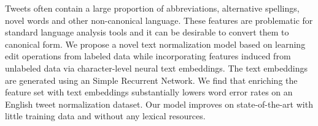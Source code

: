 Tweets often contain a large proportion of abbreviations, alternative spellings, novel words and other non-canonical language. These features are problematic for standard language analysis tools and it can be desirable to convert them to canonical form.  We propose a novel text normalization model based on learning edit operations from labeled data while incorporating features induced from unlabeled data via character-level neural text embeddings.  The text embeddings are generated using an Simple Recurrent Network.  We find that enriching the feature set with text embeddings substantially lowers word error rates on an English tweet normalization dataset. Our model improves on state-of-the-art with little training data and without any lexical resources.
